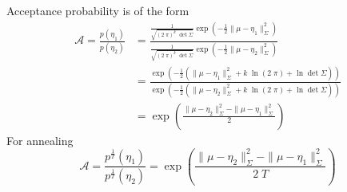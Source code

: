 \documentclass{article}         %
\theoremstyle{definition}
\theoremstyle{remark}
\begin{document}
Acceptance probability is of the form
\[
 \begin{split}
\mathcal{A} = \frac{p(\eta_1)}{p(\eta_2)} 
     &      = \frac{
       \frac{1}{\sqrt{ (2 \; \pi)^k \; \det{\Sigma}} } \exp\left( - \frac{1}{2}
                                                     \| \mu - \eta_1\|^2_{\Sigma}
                                             \right)
                   }{
       \frac{1}{\sqrt{ (2 \; \pi)^k \; \det{\Sigma}} } \exp\left( - \frac{1}{2}
                                                     \| \mu - \eta_2\|^2_{\Sigma}
                                             \right)
                   } 
     \\
     &      = \frac{
        \exp\left( - \frac{1}{2} \left(
           \| \mu - \eta_1\|^2_{\Sigma} + k\; \ln (2 \; \pi) + \ln \det{\Sigma}
                                             \right) \right)
                   }{
        \exp\left( - \frac{1}{2} \left(
           \| \mu - \eta_2\|^2_{\Sigma} + k\; \ln (2 \; \pi) + \ln \det{\Sigma}
                                             \right) \right)
                   } 
     \\
     &      = 
        \exp\left(  \frac{
      \| \mu - \eta_2\|^2_{\Sigma}  - \| \mu - \eta_1\|^2_{\Sigma} 
                 }{2}    
            \right)
 \end{split}
\]
For annealing
\[
\mathcal{A} = \frac{p^\frac{1}{T}(\eta_1)}{p^\frac{1}{T}(\eta_2)}  
            = \exp\left(  \frac{
      \| \mu - \eta_2\|^2_{\Sigma}  - \| \mu - \eta_1\|^2_{\Sigma} 
                 }{2\;T}    
            \right)
\]
\end{document}
